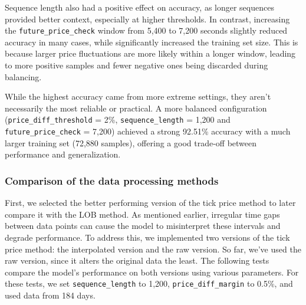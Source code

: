 \documentclass[a4paper,oneside,onecolumn,12pt]{book}
\begin{document}
		Sequence length also had a positive effect on accuracy, as longer sequences provided better context, especially at higher thresholds. In contrast, increasing the \texttt{future\_price\_check} window from 5,400 to 7,200 seconds slightly reduced accuracy in many cases, while significantly increased the training set size. This is because larger price fluctuations are more likely within a longer window, leading to more positive samples and fewer negative ones being discarded during balancing.

		While the highest accuracy came from more extreme settings, they aren't necessarily the most reliable or practical. A more balanced configuration (\texttt{price\_diff\_threshold} = 2\%, \texttt{sequence\_length} = 1,200 and \texttt{future\_price\_check} = 7,200) achieved a strong 92.51\% accuracy with a much larger training set (72,880 samples), offering a good trade-off between performance and generalization.

		\subsubsection{Comparison of the data processing methods}
		First, we selected the better performing version of the tick price method to later compare it with the LOB method. As mentioned earlier, irregular time gaps between data points can cause the model to misinterpret these intervals and degrade performance. To address this, we implemented two versions of the tick price method: the interpolated version and the raw version. So far, we've used the raw version, since it alters the original data the least. The following tests compare the model's performance on both versions using various parameters. For these tests, we set \texttt{sequence\_length} to 1,200, \texttt{price\_diff\_margin} to 0.5\%, and used data from 184 days.
\end{document}
